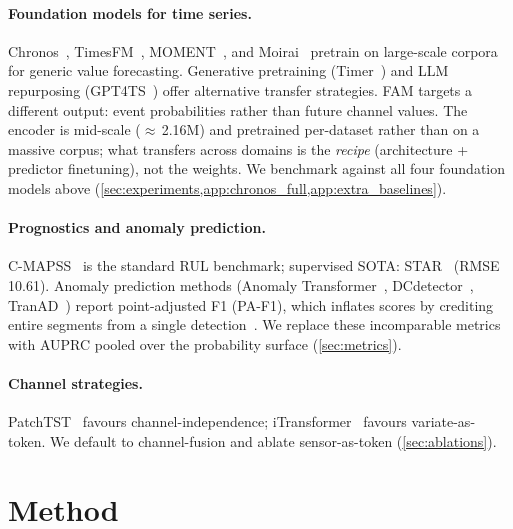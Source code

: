 \documentclass{article}
\begin{document}
\paragraph{Foundation models for time series.}
Chronos~\citep{ansari2024chronos}, TimesFM~\citep{das2024timesfm}, MOMENT~\citep{goswami2024moment}, and Moirai~\citep{woo2024unified} pretrain on large-scale corpora for generic value forecasting. Generative pretraining (Timer~\citep{liu2024timer}) and LLM repurposing (GPT4TS~\citep{zhou2023gpt4ts}) offer alternative transfer strategies. FAM targets a different output: event probabilities rather than future channel values. The encoder is mid-scale ($\approx$\,2.16M) and pretrained per-dataset rather than on a massive corpus; what transfers across domains is the \emph{recipe} (architecture + predictor finetuning), not the weights. We benchmark against all four foundation models above (\cref{sec:experiments,app:chronos_full,app:extra_baselines}).

\paragraph{Prognostics and anomaly prediction.}
C-MAPSS~\citep{saxena2008cmapss} is the standard RUL benchmark; supervised SOTA: STAR~\citep{fan2024star} (RMSE 10.61). Anomaly prediction methods (Anomaly Transformer~\citep{xu2022anomalytransformer}, DCdetector~\citep{yang2023dcdetector}, TranAD~\citep{tuli2022tranad}) report point-adjusted F1 (PA-F1), which inflates scores by crediting entire segments from a single detection~\citep{kim2022rigorous,schmidl2022tsadeval}. We replace these incomparable metrics with AUPRC pooled over the probability surface (\cref{sec:metrics}).

\paragraph{Channel strategies.}
PatchTST~\citep{nie2023patchtst} favours channel-independence; iTransformer~\citep{liu2024itransformer} favours variate-as-token. We default to channel-fusion and ablate sensor-as-token (\cref{sec:ablations}).

\section{Method}
\label{sec:method}
\end{document}
